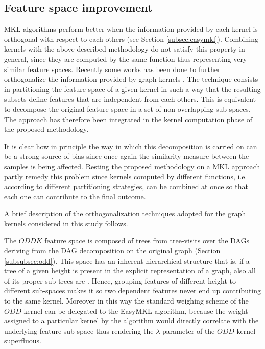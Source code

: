 
\subsection{Feature space improvement}
\label{subsec:features}

MKL algorithms perform better when the information provided by each kernel is
orthogonal with respect to each others (see Section \ref{subsec:easymkl}).
Combining kernels with the above described methodology do not satisfy this property
in general, since they are computed by the same function thus representing very similar feature
spaces.
Recently some works has been done to further orthogonalize the information
provided by graph kernels \cite{gmkl}.
The technique consists in partitioning the feature space of a given kernel in such
a way that the resulting subsets define features that are independent from each others.
This is equivalent to decompose the original feature space in a set of non-overlapping
sub-spaces.
The approach has therefore been integrated in the kernel computation phase of
the proposed methodology.

It is clear how in principle the way in which this decomposition is carried on can be a
strong source of bias since once again the similarity measure between the samples
is being affected.
Resting the proposed methodology on a MKL approach partly remedy this problem since
kernels computed by different functions, i.e. according to different partitioning
strategies, can be combined at once so that each one can contribute to the final
outcome.

A brief description of the orthogonalization techniques adopted for the graph
kernels considered in this study follows.

The $ODDK$ feature space is composed of trees from tree-visits over the DAGs
deriving from the DAG decomposition on the original graph (Section \ref{subsubsec:odd}).
This space has an inherent hierarchical structure that is, if a tree of a given
height is present in the explicit representation of a graph, also all of its proper
sub-trees are \cite{gmkl}.
Hence, grouping features of different height to different sub-spaces makes it so
two dependent features never end up contributing to the same kernel.
Moreover in this way the standard weighing scheme of the $ODD$ kernel can be
delegated to the EasyMKL algorithm, because the weight assigned to a particular
kernel by the algorithm would directly correlate with the underlying feature
sub-space thus rendering the $\lambda$ parameter of the $ODD$ kernel superfluous.

